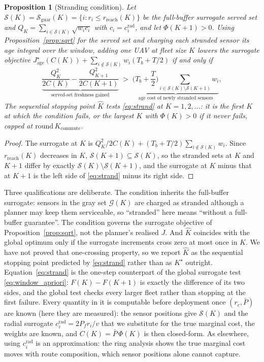 \documentclass[journal,outdir=./]{IEEEtran}
\newtheorem{proposition}{Proposition}
\newcommand{\Kc}{K_{\mathrm{commute}}}
\newcommand{\rc}{r_{c}}
\newcommand{\Pbar}{\bar{P}}
\newcommand{\Pf}{P_{f}}
\begin{document}
\begin{proposition}[Stranding condition]\label{prop:strand}
Let $\mathcal{S}(K)=\mathcal{S}_{\mathrm{guar}}(K)=\{i:r_i\le r_{\mathrm{reach}}(K)\}$ be the full-buffer surrogate served set and $Q_K=\sum_{i\in\mathcal{S}(K)}\sqrt{w_ic_i}$ with $c_i=c_i^{\mathrm{rad}}$, and let $\Phi(K+1)>0$. Using Proposition~\ref{prop:sqrt} for the served set and charging each stranded sensor its age integral over the window, adding one UAV at fleet size $K$ lowers the \emph{surrogate} objective $J_{\mathrm{age}}^{\star}(C(K))+\sum_{i\notin\mathcal{S}(K)}w_i(T_b+T/2)$ if and only if
\begin{equation}\label{eq:strand}
\underbrace{\frac{Q_K^2}{2C(K)}-\frac{Q_{K+1}^2}{2C(K{+}1)}}_{\text{served-set freshness gained}}\;>\;\underbrace{\Big(T_b+\frac{T}{2}\Big)\!\!\sum_{i\in\mathcal{S}(K)\setminus\mathcal{S}(K+1)}\!\! w_i}_{\text{age cost of newly stranded sensors}},
\end{equation}
The sequential stopping point $\hat K$ tests \eqref{eq:strand} at $K=1,2,\dots$: it is the first $K$ at which the condition fails, or the largest $K$ with $\Phi(K)>0$ if it never fails, capped at $\mathrm{round}\,\Kc$.
\end{proposition}
\begin{proof}
The surrogate at $K$ is $Q_K^2/2C(K)+(T_b+T/2)\sum_{i\notin\mathcal{S}(K)}w_i$. Since $r_{\mathrm{reach}}(K)$ decreases in $K$, $\mathcal{S}(K+1)\subseteq\mathcal{S}(K)$, so the stranded sets at $K$ and $K+1$ differ by exactly $\mathcal{S}(K)\setminus\mathcal{S}(K+1)$, and the surrogate at $K$ minus that at $K+1$ is the left side of \eqref{eq:strand} minus its right side.
\end{proof}
Three qualifications are deliberate. The condition inherits the full-buffer surrogate: sensors in the gray set $\mathcal{G}(K)$ are charged as stranded although a planner may keep them serviceable, so ``stranded'' here means ``without a full-buffer guarantee''. The condition governs the surrogate objective of Proposition~\ref{prop:sqrt}, not the planner's realised $J$. And $\hat K$ coincides with the global optimum only if the surrogate increments cross zero at most once in $K$. We have not proved that one-crossing property, so we report $\hat K$ as the sequential stopping point predicted by \eqref{eq:strand} rather than as $K^{\star}$ outright.
Equation~\eqref{eq:strand} is the one-step counterpart of the global surrogate test \eqref{eq:window_apriori}: $F(K)-F(K{+}1)$ is exactly the difference of its two sides, and the global test checks every larger fleet rather than stopping at the first failure. Every quantity in it is computable before deployment once $(\rc,\Pbar)$ are known (here they are measured): the sensor positions give $\mathcal{S}(K)$ and the radial surrogate $c_i^{\mathrm{rad}}=2\Pf r_i/v$ that we substitute for the true marginal cost, the weights are known, and $C(K)=\Pbar\,\Phi(K)$ is then closed-form. As elsewhere, using $c_i^{\mathrm{rad}}$ is an approximation: the ring analysis shows the true marginal cost moves with route composition, which sensor positions alone cannot capture.
\end{document}
